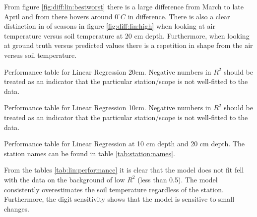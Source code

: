 From figure \ref{fig:diff:lin:bestworst} there is a large difference from March to late April and from there hovers around $0^\circ C$ in difference. 
There is also a clear distinction in of seasons in figure \ref{fig:diff:lin:high} when looking at air temperature versus soil temperature at 20 cm depth. \label{text:lin:seasons}
Furthermore, when looking at ground truth versus predicted values there is a repetition in shape from the air versus soil temperature. 

\begin{table}
	\begin{subtable}{0.8\textwidth}
		
		\caption{Performance table for Linear Regression 20cm. Negative numbers in $R^2$ should be treated as an indicator that the particular station/scope is not well-fitted to the data.}
	\end{subtable}
	\begin{subtable}{0.8\textwidth}
		
		\caption{Performance table for Linear Regression 10cm. Negative numbers in $R^2$ should be treated as an indicator that the particular station/scope is not well-fitted to the data.}
	\end{subtable}
	\caption{Performance table for Linear Regression at 10 cm depth and 20 cm depth. The station names can be found in table \ref{tab:station:names}.}
	\label{tab:lin:performance}
\end{table}

From the tables \ref{tab:lin:performance} it is clear that the model does not fit fell with the data on the background of low $R^2$ (less than 0.5). The model consistently overestimates the soil temperature regardless of the station. Furthermore, the digit sensitivity shows that the model is sensitive to small changes.


